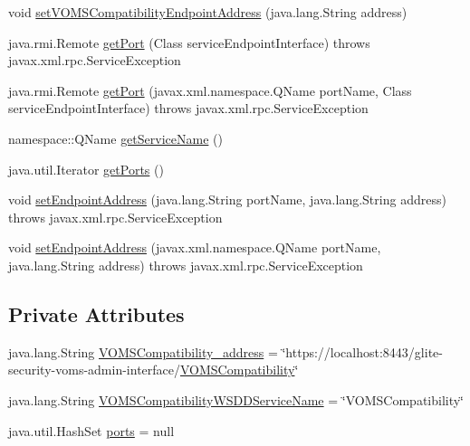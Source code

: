 \begin{DoxyCompactItemize}
\item 
void \hyperlink{classorg_1_1glite_1_1security_1_1voms_1_1service_1_1compatibility_1_1VOMSCompatibilityServiceLocator_a55522eb8c45fc41e2818243f89e7b798}{setVOMSCompatibilityEndpointAddress} (java.lang.String address)
\item 
java.rmi.Remote \hyperlink{classorg_1_1glite_1_1security_1_1voms_1_1service_1_1compatibility_1_1VOMSCompatibilityServiceLocator_a493ba898a7ac580d765db792726c212a}{getPort} (Class serviceEndpointInterface)  throws javax.xml.rpc.ServiceException 
\item 
java.rmi.Remote \hyperlink{classorg_1_1glite_1_1security_1_1voms_1_1service_1_1compatibility_1_1VOMSCompatibilityServiceLocator_a043c4f0f53ebd2a929b36e469c440b0b}{getPort} (javax.xml.namespace.QName portName, Class serviceEndpointInterface)  throws javax.xml.rpc.ServiceException 
\item 
namespace::QName \hyperlink{classorg_1_1glite_1_1security_1_1voms_1_1service_1_1compatibility_1_1VOMSCompatibilityServiceLocator_aee212f56af4ef41b33cd5d2fef7059b2}{getServiceName} ()
\item 
java.util.Iterator \hyperlink{classorg_1_1glite_1_1security_1_1voms_1_1service_1_1compatibility_1_1VOMSCompatibilityServiceLocator_aa8efc072c7b3090f70426c98a232f646}{getPorts} ()
\item 
void \hyperlink{classorg_1_1glite_1_1security_1_1voms_1_1service_1_1compatibility_1_1VOMSCompatibilityServiceLocator_a6b33d464f58b25b09387ac85cd72f880}{setEndpointAddress} (java.lang.String portName, java.lang.String address)  throws javax.xml.rpc.ServiceException 
\item 
void \hyperlink{classorg_1_1glite_1_1security_1_1voms_1_1service_1_1compatibility_1_1VOMSCompatibilityServiceLocator_ad72ee1dfe54210cf6c72e45dafbfdba1}{setEndpointAddress} (javax.xml.namespace.QName portName, java.lang.String address)  throws javax.xml.rpc.ServiceException 
\end{DoxyCompactItemize}
\subsection*{Private Attributes}
\begin{DoxyCompactItemize}
\item 
java.lang.String \hyperlink{classorg_1_1glite_1_1security_1_1voms_1_1service_1_1compatibility_1_1VOMSCompatibilityServiceLocator_a1ce23128367b21c3f65ae5f30ca92795}{VOMSCompatibility\_\-address} = \char`\"{}https://localhost:8443/glite-\/security-\/voms-\/admin-\/interface/\hyperlink{interfaceorg_1_1glite_1_1security_1_1voms_1_1service_1_1compatibility_1_1VOMSCompatibility}{VOMSCompatibility}\char`\"{}
\item 
java.lang.String \hyperlink{classorg_1_1glite_1_1security_1_1voms_1_1service_1_1compatibility_1_1VOMSCompatibilityServiceLocator_a7e668f5502e13d2b520cab0b1b8f30b4}{VOMSCompatibilityWSDDServiceName} = \char`\"{}VOMSCompatibility\char`\"{}
\item 
java.util.HashSet \hyperlink{classorg_1_1glite_1_1security_1_1voms_1_1service_1_1compatibility_1_1VOMSCompatibilityServiceLocator_a335d56852056cb54d1eed2d21d3cd8ce}{ports} = null
\end{DoxyCompactItemize}


